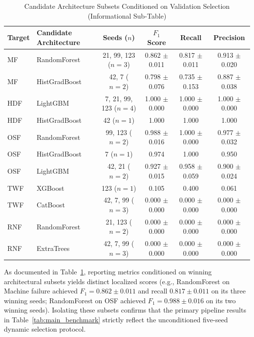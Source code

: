 \documentclass[conference]{IEEEtran}
\begin{document}
\begin{table}[h]
\caption{Candidate Architecture Subsets Conditioned on Validation Selection (Informational Sub-Table)}
\centering
\begin{tabular}{llcccc}
\toprule
\textbf{Target} & \textbf{Candidate Architecture} & \textbf{Seeds ($n$)} & \textbf{$F_1$ Score} & \textbf{Recall} & \textbf{Precision} \\
\midrule
MF & RandomForest & 21, 99, 123 ($n=3$) & 0.862 $\pm$ 0.011 & 0.817 $\pm$ 0.011 & 0.913 $\pm$ 0.020 \\
MF & HistGradBoost & 42, 7 ($n=2$) & 0.798 $\pm$ 0.076 & 0.735 $\pm$ 0.153 & 0.887 $\pm$ 0.038 \\
HDF & LightGBM & 7, 21, 99, 123 ($n=4$) & 1.000 $\pm$ 0.000 & 1.000 $\pm$ 0.000 & 1.000 $\pm$ 0.000 \\
HDF & HistGradBoost & 42 ($n=1$) & 1.000 & 1.000 & 1.000 \\
OSF & RandomForest & 99, 123 ($n=2$) & 0.988 $\pm$ 0.016 & 1.000 $\pm$ 0.000 & 0.977 $\pm$ 0.032 \\
OSF & HistGradBoost & 7 ($n=1$) & 0.974 & 1.000 & 0.950 \\
OSF & LightGBM & 42, 21 ($n=2$) & 0.927 $\pm$ 0.015 & 0.958 $\pm$ 0.059 & 0.900 $\pm$ 0.024 \\
TWF & XGBoost & 123 ($n=1$) & 0.105 & 0.400 & 0.061 \\
TWF & CatBoost & 42, 7, 99 ($n=3$) & 0.000 $\pm$ 0.000 & 0.000 $\pm$ 0.000 & 0.000 $\pm$ 0.000 \\
RNF & RandomForest & 21, 123 ($n=2$) & 0.000 $\pm$ 0.000 & 0.000 $\pm$ 0.000 & 0.000 $\pm$ 0.000 \\
RNF & ExtraTrees & 42, 7, 99 ($n=3$) & 0.000 $\pm$ 0.000 & 0.000 $\pm$ 0.000 & 0.000 $\pm$ 0.000 \\
\bottomrule
\end{tabular}
\label{tab:candidate_subsets}
\end{table}

As documented in Table~\ref{tab:candidate_subsets}, reporting metrics conditioned on winning architectural subsets yields distinct localized scores (e.g., RandomForest on Machine failure achieved $F_1 = 0.862 \pm 0.011$ and recall $0.817 \pm 0.011$ on its three winning seeds; RandomForest on OSF achieved $F_1 = 0.988 \pm 0.016$ on its two winning seeds). Isolating these subsets confirms that the primary pipeline results in Table~\ref{tab:main_benchmark} strictly reflect the unconditioned five-seed dynamic selection protocol.
\end{document}
